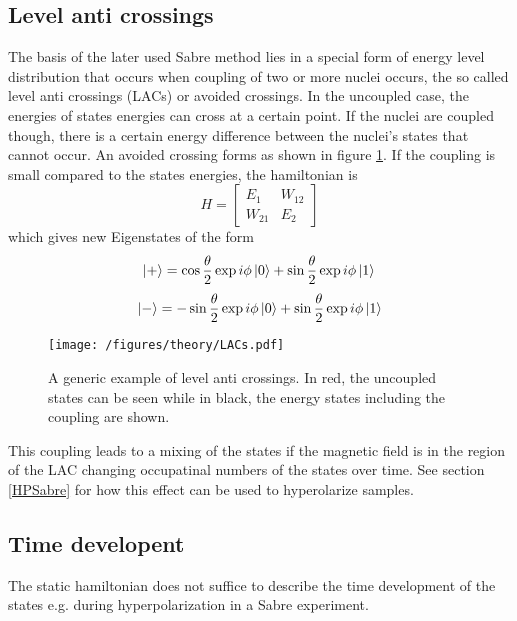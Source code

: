         \subsection{Level anti crossings}
        The basis of the later used Sabre method lies in a special form of energy level distribution that occurs when coupling of two or more nuclei occurs, the so called level anti crossings (LACs) or avoided crossings. In the uncoupled case, the energies of states energies can cross at a certain point. If the nuclei are coupled though, there is a certain energy difference between the nuclei's states that cannot occur. An avoided crossing forms as shown in figure \ref{figure:theory:LAC}. If the coupling is small compared to the states energies, the hamiltonian is 
        \begin{equation}
            H = \left [
                \begin{array}{ll}
                    E_{1} & W_{12}\\
                    W_{21} & E_2
                \end{array}
            \right ]
        \end{equation} 
        which gives new Eigenstates of the form
        \begin{equation*}
            \ket{+} = \cos\frac{{\theta}}{2}\exp{i\phi}\ket{0} + \sin{\frac{\theta}{2}}\exp{i\phi}\ket{1}\\
        \end{equation*}
        \begin{equation*}
            \ket{-} = -\sin{\frac{\theta}{2}}\exp{i\phi}\ket{0} + \sin{\frac{\theta}{2}}\exp{i\phi}\ket{1}
        \end{equation*}
            \begin{figure}
                \texttt{[image: /figures/theory/LACs.pdf]}
                \caption[Leval anti crossings]{A generic example of level anti crossings. In red, the uncoupled states can be seen while in black, the energy states including the coupling are shown.}
                \label{figure:theory:LAC}
            \end{figure}
            This coupling leads to a mixing of the states if the magnetic field is in the region of the LAC changing occupatinal numbers of the states over time. See section \ref{HPSabre} for how this effect can be used to hyperolarize samples.
            \subsection{Time developent}
            The static hamiltonian does not suffice to describe the time development of the states e.g. during hyperpolarization in a Sabre experiment.
